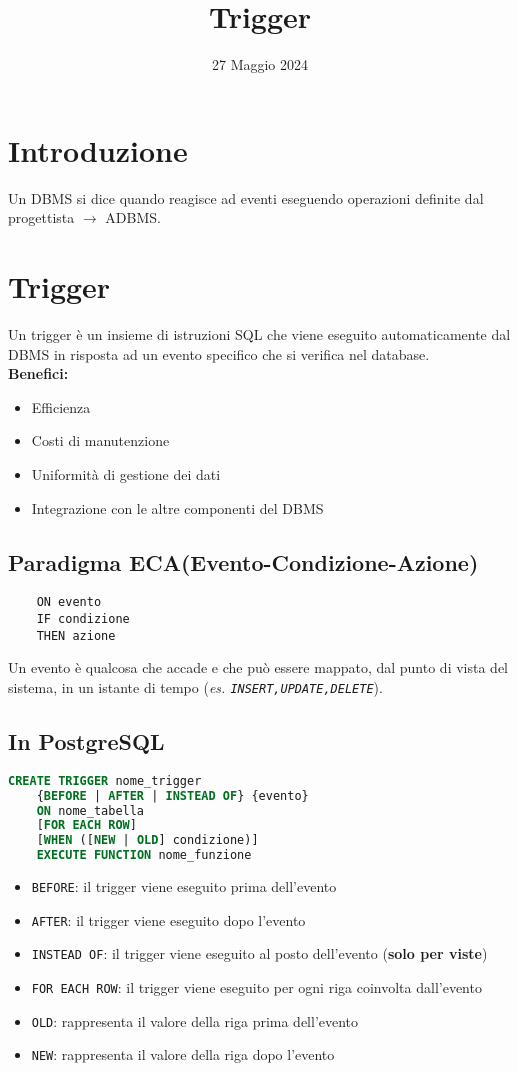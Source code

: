 \documentclass[12pt]{article}
\title{Trigger}
\date{27 Maggio 2024}
\begin{document}
\maketitle
\section{Introduzione}
Un DBMS si dice  quando reagisce ad eventi eseguendo operazioni definite dal progettista $\rightarrow$ ADBMS. 
\section{Trigger}
Un trigger è un insieme di istruzioni SQL che viene eseguito automaticamente dal DBMS in risposta ad un evento specifico che si verifica nel database.\\
\textbf{Benefici:}
\begin{itemize}
    \item Efficienza
    \item Costi di manutenzione
    \item Uniformità di gestione dei dati
    \item Integrazione con le altre componenti del DBMS
\end{itemize}
\subsection{Paradigma ECA(Evento-Condizione-Azione)}
\begin{lstlisting}
    ON evento
    IF condizione
    THEN azione
\end{lstlisting}
Un evento è qualcosa che accade e che può essere
mappato, dal punto di vista del sistema, in un istante di tempo (\textit{es. \texttt{INSERT,UPDATE,DELETE}}).
\subsection{In PostgreSQL}
\begin{lstlisting}[language=SQL]
    CREATE TRIGGER nome_trigger
    {BEFORE | AFTER | INSTEAD OF} {evento}
    ON nome_tabella
    [FOR EACH ROW]
    [WHEN ([NEW | OLD] condizione)]
    EXECUTE FUNCTION nome_funzione
\end{lstlisting}
\begin{itemize}
    \item \texttt{BEFORE}: il trigger viene eseguito prima dell'evento
    \item \texttt{AFTER}: il trigger viene eseguito dopo l'evento
    \item \texttt{INSTEAD OF}: il trigger viene eseguito al posto dell'evento (\textbf{solo per viste})
    \item \texttt{FOR EACH ROW}: il trigger viene eseguito per ogni riga coinvolta dall'evento
    \item \texttt{OLD}: rappresenta il valore della riga prima dell'evento
    \item \texttt{NEW}: rappresenta il valore della riga dopo l'evento
\end{itemize}
\end{document}
